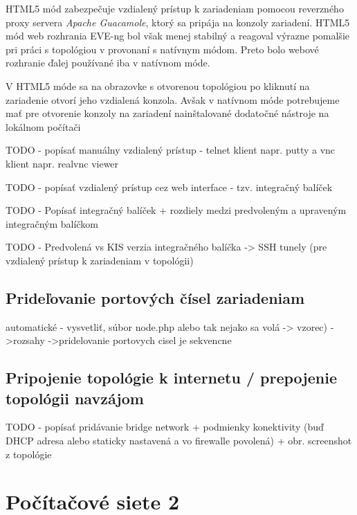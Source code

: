 \begin{enumerate}[noitemsep]
        HTML5 mód zabezpečuje vzdialený prístup k zariadeniam pomocou reverzného proxy servera \emph{Apache Guacamole}, ktorý sa pripája na konzoly zariadení. HTML5 mód web rozhrania EVE-ng bol však menej stabilný a reagoval výrazne pomalšie pri práci s topológiou v provonaní s natívnym módom. Preto bolo webové rozhranie ďalej používané iba v natívnom móde.
        
        V HTML5 móde sa na obrazovke s otvorenou topológiou po kliknutí na zariadenie otvorí jeho vzdialená konzola. Avšak v natívnom móde potrebujeme mať pre otvorenie konzoly na zariadení nainštalované dodatočné nástroje na lokálnom počítači
        
{\huge TODO - popísať manuálny vzdialený prístup - telnet klient napr. putty a vnc klient napr. realvnc viewer}
        
{\huge TODO - popísať vzdialený prístup cez web interface - tzv. integračný balíček}
        
{\huge TODO - Popísať integračný balíček + rozdiely medzi predvoleným a upraveným integračným balíčkom}
        
{\huge TODO - Predvolená vs KIS verzia integračného balíčka -> SSH tunely (pre vzdialený prístup k zariadeniam v topológii)}

\end{enumerate}





\subsection{Prideľovanie portových čísel zariadeniam}
    automatické - vysvetliť, súbor node.php alebo tak nejako sa volá -> vzorec)
    ->rozsahy
    ->pridelovanie portovych cisel je sekvencne




\subsection{Pripojenie topológie k internetu / prepojenie topológii navzájom}

{\huge TODO - popísať pridávanie bridge network + podmienky konektivity (buď DHCP adresa alebo staticky nastavená a vo firewalle povolená) + obr. screenshot z topológie}






\section{Počítačové siete 2}

